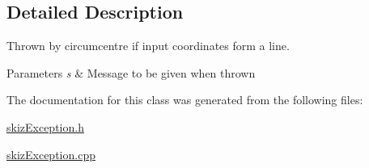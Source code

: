 \subsection{Detailed Description}
Thrown by circumcentre if input coordinates form a line. 


\begin{DoxyParams}{Parameters}
{\em s} & Message to be given when thrown \\
\hline
\end{DoxyParams}


The documentation for this class was generated from the following files\+:\begin{DoxyCompactItemize}
\item 
\mbox{\hyperlink{skizException_8h}{skiz\+Exception.\+h}}\item 
\mbox{\hyperlink{skizException_8cpp}{skiz\+Exception.\+cpp}}\end{DoxyCompactItemize}

